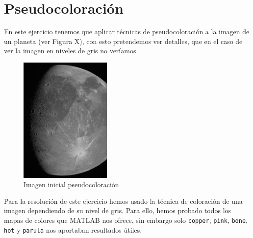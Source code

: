 \documentclass[12pt]{article}
\begin{document}
	\section{Pseudocoloración}
	
	\noindent En este ejercicio tenemos que aplicar técnicas de pseudocoloración a la imagen de un planeta (ver Figura X), con esto pretendemos ver detalles, que en el caso de ver la imagen en niveles de gris no veríamos.
	
	\begin{figure}[h]
		\begin{center}
			\includegraphics[width=0.4\textwidth]{img/pseudocoloracion.jpg}
			\caption{Imagen inicial pseudocoloración}
			\label{img: pseudocoloración src}
		\end{center}
	\end{figure}

	\noindent Para la resolución de este ejercicio hemos usado la técnica de coloración de una imagen dependiendo de su nivel de gris. Para ello, hemos probado todos los mapas de colores que MATLAB nos ofrece, sin embargo solo \texttt{copper}, \texttt{pink}, \texttt{bone}, \texttt{hot} y \texttt{parula} nos aportaban resultados útiles.
	
\end{document}

